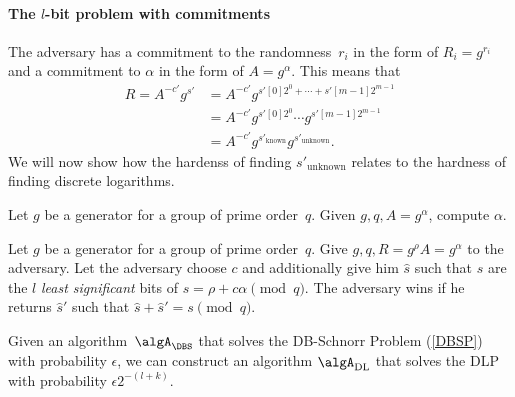 \paragraph*{The \(l\)-bit problem with commitments}

The adversary has a commitment to the randomness~\(r_i\) in the form of \(R_i = 
g^{r_i}\) and a commitment to \(\alpha\) in the form of \(A = g^\alpha\).
This means that
\begin{align*}
  R = A^{-c'} g^{s'} &= A^{-c'} g^{s'[0] 2^0 + \dotsb + s'[m-1] 2^{m-1}} \\
                     &= A^{-c'} g^{s'[0] 2^0} \dotsb g^{s'[m-1] 2^{m-1}} \\
                     &= A^{-c'} g^{s'_{\text{known}}} g^{s'_{\text{unknown}}}.
\end{align*}
We will now show how the hardenss of finding \(s'_{\text{unknown}}\) relates to 
the hardness of finding discrete logarithms.

\begin{definition}
  Let \(g\) be a generator for a group of prime order~\(q\).
  Given \(g, q, A = g^\alpha\), compute \(\alpha\).
\end{definition}

\begin{definition}%
  \label{DBSP}
  Let \(g\) be a generator for a group of prime order~\(q\).
  Give \(g, q, R = g^\rho A = g^\alpha\) to the adversary.
  Let the adversary choose \(c\) and additionally give him \(\hat s\) such that 
  \(\hat s\) are the \(l\) \emph{least significant} bits of \(s = \rho + 
  c\alpha \pmod q\).
  The adversary wins if he returns \(\hat s'\) such that \(\hat s + \hat s' = s 
  \pmod q\).
\end{definition}

\begin{lemma}\label{DBSPtoDLP}
  Given an algorithm~\(\algA_{\DBS}\) that solves the DB-Schnorr Problem 
  (\cref{DBSP}) with probability \(\epsilon\), we can construct an 
  algorithm \(\algA_{\text{DL}}\) that solves the \ac{DLP} with probability 
  \(\epsilon 2^{-(l+k)}\).
\end{lemma}

